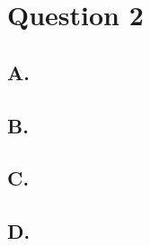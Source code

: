 \documentclass[12pt]{article}
\begin{document}
\section*{Question 2}
\subsection*{A.}
\subsection*{B.}
\subsection*{C.}
\subsection*{D.}
\end{document}
